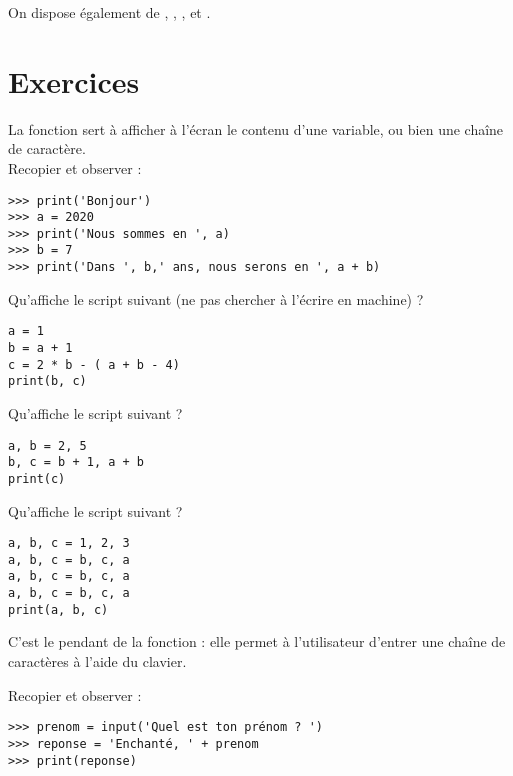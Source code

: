 On dispose également de \pythoninline{*=}, \pythoninline{//=}, \pythoninline{\%=}, \pythoninline{-=} et \pythoninline{**=}.
\section{Exercices}

\begin{exercice}

    La fonction  sert à afficher à l'écran le contenu d'une variable, ou bien une chaîne de caractère.\\
    Recopier et observer :
\begin{verbatim}
>>> print('Bonjour')
>>> a = 2020
>>> print('Nous sommes en ', a)
>>> b = 7
>>> print('Dans ', b,' ans, nous serons en ', a + b)
\end{verbatim}
\end{exercice}

\begin{exercice}[ : affectations 1]

    Qu'affiche le script suivant (ne pas chercher à l'écrire en machine) ?
\begin{verbatim}
a = 1
b = a + 1
c = 2 * b - ( a + b - 4)
print(b, c)
\end{verbatim}
\end{exercice}

\begin{exercice}[ : affectations 2]
    Qu'affiche le script suivant ?
    
    \begin{verbatim}
a, b = 2, 5
b, c = b + 1, a + b
print(c)
    \end{verbatim}
    \end{exercice}

    \begin{exercice}[ : affectations 3]
        Qu'affiche le script suivant ?
        \begin{verbatim}    
a, b, c = 1, 2, 3
a, b, c = b, c, a
a, b, c = b, c, a
a, b, c = b, c, a
print(a, b, c)
        \end{verbatim}
    \end{exercice}

\begin{exercice}

    C'est le pendant de la fonction  : elle permet à l'utilisateur d'entrer une chaîne de caractères à l'aide du clavier.

    Recopier et observer :
\begin{verbatim}
>>> prenom = input('Quel est ton prénom ? ')
>>> reponse = 'Enchanté, ' + prenom
>>> print(reponse)
\end{verbatim}
\end{exercice}


